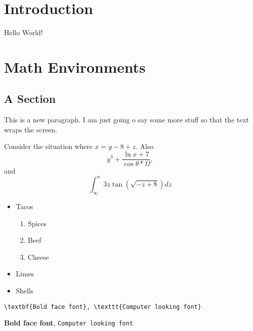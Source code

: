 \documentclass[12pt]{article}
\begin{document}
\section{Introduction}

Hello World!

\section{Math Environments}

\subsection{A Section}

This is a new paragraph. I am just going o say some more stuff so that the text wraps the screen.

Consider the situation where $x = y-8+z$. 
Also $$y^3 + \frac{\ln{x}+7}{\cos{\theta*\Omega}} ,$$ and $$\int_\infty^\pi 3z\tan{(\sqrt{-z+8})}dz$$

\begin{itemize}
	\item Tacos
	\begin{enumerate}
		\item Spices
		\item Beef
		\item Cheese
	\end{enumerate}
	\item Limes
	\item Shells
\end{itemize}

\begin{verbatim}
\textbf{Bold face font}, \texttt{Computer looking font}
\end{verbatim}

\textbf{Bold face font}, \texttt{Computer looking font}
\end{document}
